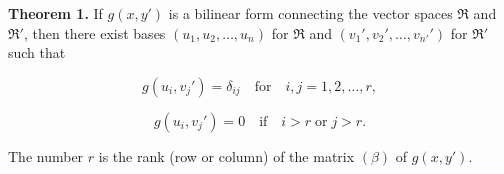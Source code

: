 \textbf{Theorem 1.} If $g(x, y')$ is a bilinear form connecting the vector spaces $\mathfrak{R}$ and $\mathfrak{R}'$, then there exist bases $(u_1, u_2, \dots, u_n)$ for $\mathfrak{R}$ and $(v_1', v_2', \dots, v_{n'}')$ for $\mathfrak{R}'$ such that

$$g(u_i, v_j') = \delta_{ij} \quad \text{for} \quad i, j = 1, 2, \dots, r,$$

$$g(u_i, v_j') = 0 \quad \text{if} \quad i > r \;\text{or}\; j > r.$$

The number $r$ is the rank (row or column) of the matrix $(\beta)$ of $g(x, y')$.
